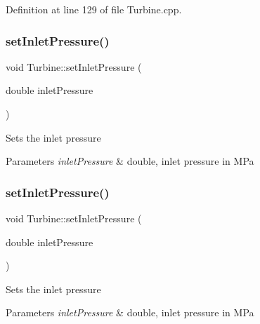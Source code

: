 Definition at line 129 of file Turbine.\+cpp.

\mbox{\label{class_turbine_a04996baab9a40d449a69c737c00be8e4}} 
\subsubsection{\texorpdfstring{set\+Inlet\+Pressure()}{setInletPressure()}\hspace{0.1cm}{\footnotesize\ttfamily [2/3]}}
{\footnotesize\ttfamily void Turbine\+::set\+Inlet\+Pressure (\begin{DoxyParamCaption}\item[{double}]{inlet\+Pressure }\end{DoxyParamCaption})}

Sets the inlet pressure


\begin{DoxyParams}{Parameters}
{\em inlet\+Pressure} & double, inlet pressure in M\+Pa \\
\hline
\end{DoxyParams}
\mbox{\label{class_turbine_a04996baab9a40d449a69c737c00be8e4}} 
\subsubsection{\texorpdfstring{set\+Inlet\+Pressure()}{setInletPressure()}\hspace{0.1cm}{\footnotesize\ttfamily [3/3]}}
{\footnotesize\ttfamily void Turbine\+::set\+Inlet\+Pressure (\begin{DoxyParamCaption}\item[{double}]{inlet\+Pressure }\end{DoxyParamCaption})}

Sets the inlet pressure


\begin{DoxyParams}{Parameters}
{\em inlet\+Pressure} & double, inlet pressure in M\+Pa \\
\hline
\end{DoxyParams}
\mbox{\label{class_turbine_aecc05c70870fb11bbc0bb4fe5d8438bd}} 
